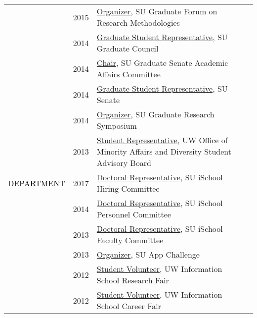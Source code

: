 \documentclass[12pt]{article}
\begin{document}
{{\begin{longtable}{Rp{1.0in}p{0.25in}p{4.75in}}
& \footnotesize{2015} & \href{http://gradresearch.syr.edu}{{Organizer}}, SU Graduate Forum on Research Methodologies \\

& \footnotesize{2014} & \href{http://gradorg.syr.edu/senate/committees/}{{Graduate Student Representative}}, SU Graduate Council \\

& \footnotesize{2014} & \href{http://gradorg.syr.edu/senate/committees/}{{Chair}}, SU Graduate Senate Academic Affairs Committee \\

& \footnotesize{2014} & \href{http://universitysenate.syr.edu/}{{Graduate Student Representative}}, SU Senate \\

& \footnotesize{2014} & \href{https://www.facebook.com/sugrads/photos/tab=album\&album\_id=874022975972914}{{Organizer}}, SU Graduate Research Symposium \\

& \footnotesize{2013} & \href{http://www.washington.edu/omad/2014/05/09/no-longer-invisible-bryan-dosono/}{{Student Representative}}, UW Office of Minority Affairs and Diversity Student Advisory Board \\

\textcolor{black}{\footnotesize{\uppercase{Department}}} & \footnotesize{2017} & 
 \href{http://ischool.syr.edu/facstaff/}{{Doctoral Representative}}, SU iSchool Hiring Committee \\

& \footnotesize{2014} & \href{http://ischool.syr.edu/facstaff/}{{Doctoral Representative}}, SU iSchool Personnel Committee \\

& \footnotesize{2013} & \href{http://ischool.syr.edu/facstaff/}{{Doctoral Representative}}, SU iSchool Faculty Committee \\

& \footnotesize{2013} & \href{http://appchallenge.syr.edu/}{{Organizer}}, SU App Challenge \\

& \footnotesize{2012} & \href{http://ischool.uw.edu/current/career-services}{{Student Volunteer}}, UW Information School Research Fair \\

& \footnotesize{2012} & \href{https://web.archive.org/web/20130104065107/https://ischool.uw.edu/news/2012/11/annual-ischool-research-fair-showcases-faculty-and-student-work}{{Student Volunteer}}, UW Information School Career Fair \\


\end{longtable}}}
\end{document}
